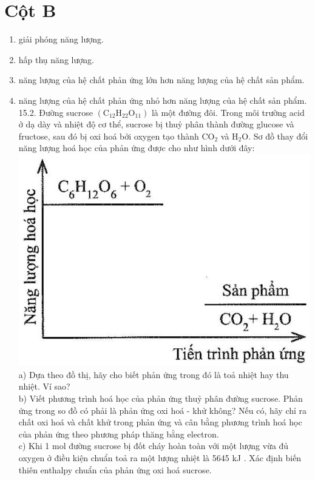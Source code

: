 \documentclass[10pt]{article}
\begin{document}
\section*{Cột B}
\begin{enumerate}
  \item giải phóng năng lượng.
  \item hấp thụ năng lượng.
  \item năng lượng của hệ chất phản ứng lớn hơn năng lượng của hệ chất sản phẩm.
  \item năng lượng của hệ chất phản ứng nhỏ hơn năng lượng của hệ chất sản phẩm.\\
15.2. Đường sucrose $\left(\mathrm{C}_{12} \mathrm{H}_{22} \mathrm{O}_{11}\right)$ là một đường đôi. Trong môi trường acid ở dạ dày và nhiệt độ cơ thể, sucrose bị thuỷ phân thành đường glucose và fructose, sau đó bị oxi hoá bởi oxygen tạo thành $\mathrm{CO}_{2}$ và $\mathrm{H}_{2} \mathrm{O}$. Sơ đồ thay đổi năng lượng hoá học của phản ứng được cho như hình dưới đây:\\
\includegraphics[max width=\textwidth, center]{2025_10_23_76620c17ffac1ae9b35bg-42}\\
a) Dựa theo đồ thị, hãy cho biết phản ứng trong đó là toả nhiệt hay thu nhiệt. Ví sao?\\
b) Viết phương trình hoá học của phản ứng thuỷ phân đường sucrose. Phản ứng trong so đồ có phải là phản ứng oxi hoá - khử không? Nếu có, hãy chỉ ra chất oxi hoá và chất khử trong phản ứng và cân bằng phương trình hoá học của phản ứng theo phương pháp thăng bằng electron.\\
c) Khi 1 mol đường sucrose bị đốt cháy hoàn toàn với một lượng vừa đủ oxygen ở điều kiện chuẩn toả ra một lượng nhiệt là 5645 kJ . Xác định biến thiên enthalpy chuẩn của phản ứng oxi hoá sucrose.\\

\end{enumerate}
\end{document}
